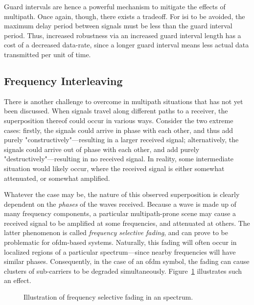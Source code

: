 \documentclass[class=report,11pt,crop=false]{standalone}
\begin{document}
Guard intervals are hence a powerful mechanism to mitigate the effects of multipath. Once again, though, there exists a tradeoff. For \gls{isi} to be avoided, the maximum delay period between signals must be less than the guard interval period. Thus, increased robustness via an increased guard interval length has a cost of a decreased data-rate, since a longer guard interval means less actual data transmitted per unit of time.

\subsection{Frequency Interleaving}
There is another challenge to overcome in multipath situations that has not yet been discussed. When signals travel along different paths to a receiver, the superposition thereof could occur in various ways. Consider the two extreme cases: firstly, the signals could arrive in phase with each other, and thus add purely "constructively"---resulting in a larger received signal; alternatively, the signals could arrive out of phase with each other, and add purely "destructively"---resulting in no received signal. In reality, some intermediate situation would likely occur, where the received signal is either somewhat attenuated, or somewhat amplified.

Whatever the case may be, the nature of this observed superposition is clearly dependent on the \emph{phases} of the waves received. Because a wave is made up of many frequency components, a particular multipath-prone scene may cause a received signal to be amplified at some frequencies, and attenuated at others. The latter phenomenon is called \emph{frequency selective fading}, and can prove to be problematic for \gls{ofdm}-based systems. Naturally, this fading will often occur in localized regions of a particular spectrum---since nearby frequencies will have similar phases. Consequently, in the case of an \gls{ofdm} symbol, the fading can cause clusters of sub-carriers to be degraded simultaneously. Figure~\ref{fig:ofdm-selective-fading} illustrates such an effect.

\begin{figure}[htbp]
    \centering
    \captionsetup{type=figure}
    \def\svgwidth{1\linewidth}
    { %
        }
    \caption{Illustration of frequency selective fading in an  spectrum.}
    \label{fig:ofdm-selective-fading}
\end{figure}
\end{document}
